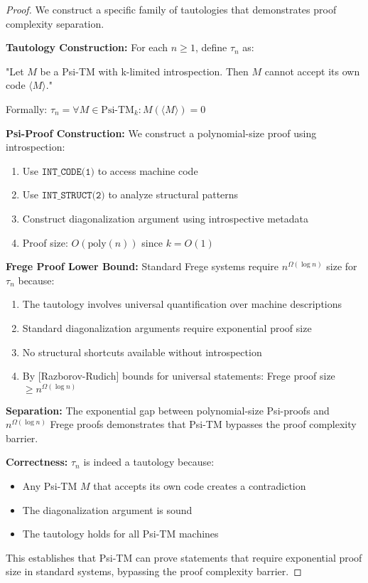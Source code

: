 \documentclass[11pt]{article}
\begin{document}
\begin{proof}
We construct a specific family of tautologies that demonstrates proof complexity separation.

\textbf{Tautology Construction:}
For each $n \geq 1$, define $\tau_n$ as:

"Let $M$ be a Psi-TM with k-limited introspection. Then $M$ cannot accept its own code $\langle M \rangle$."

Formally:
$\tau_n = \forall M \in \text{Psi-TM}_k: M(\langle M \rangle) = 0$

\textbf{Psi-Proof Construction:}
We construct a polynomial-size proof using introspection:

\begin{enumerate}
\item Use $\texttt{INT\_CODE(1)}$ to access machine code
\item Use $\texttt{INT\_STRUCT(2)}$ to analyze structural patterns
\item Construct diagonalization argument using introspective metadata
\item Proof size: $O(\text{poly}(n))$ since $k = O(1)$
\end{enumerate}

\textbf{Frege Proof Lower Bound:}
Standard Frege systems require $n^{\Omega(\log n)}$ size for $\tau_n$ because:
\begin{enumerate}
\item The tautology involves universal quantification over machine descriptions
\item Standard diagonalization arguments require exponential proof size
\item No structural shortcuts available without introspection
\item By [Razborov-Rudich] bounds for universal statements: Frege proof size $\geq n^{\Omega(\log n)}$
\end{enumerate}

\textbf{Separation:}
The exponential gap between polynomial-size Psi-proofs and $n^{\Omega(\log n)}$ Frege proofs demonstrates that Psi-TM bypasses the proof complexity barrier.

\textbf{Correctness:}
$\tau_n$ is indeed a tautology because:
\begin{itemize}
\item Any Psi-TM $M$ that accepts its own code creates a contradiction
\item The diagonalization argument is sound
\item The tautology holds for all Psi-TM machines
\end{itemize}

This establishes that Psi-TM can prove statements that require exponential proof size in standard systems, bypassing the proof complexity barrier.
\end{proof}
\end{document}
